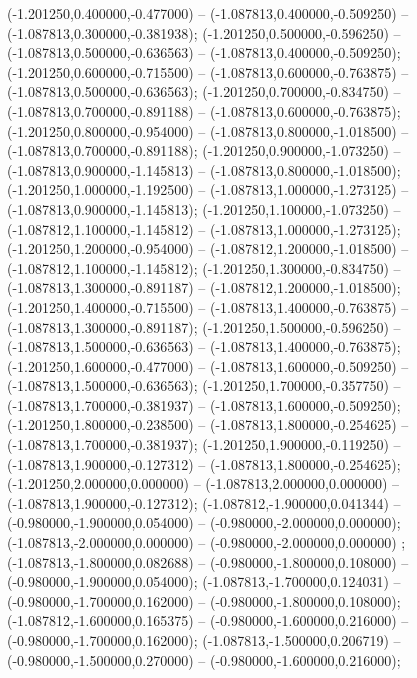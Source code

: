  (-1.201250,0.400000,-0.477000) -- (-1.087813,0.400000,-0.509250) -- (-1.087813,0.300000,-0.381938);
 (-1.201250,0.500000,-0.596250) -- (-1.087813,0.500000,-0.636563) -- (-1.087813,0.400000,-0.509250);
 (-1.201250,0.600000,-0.715500) -- (-1.087813,0.600000,-0.763875) -- (-1.087813,0.500000,-0.636563);
 (-1.201250,0.700000,-0.834750) -- (-1.087813,0.700000,-0.891188) -- (-1.087813,0.600000,-0.763875);
 (-1.201250,0.800000,-0.954000) -- (-1.087813,0.800000,-1.018500) -- (-1.087813,0.700000,-0.891188);
 (-1.201250,0.900000,-1.073250) -- (-1.087813,0.900000,-1.145813) -- (-1.087813,0.800000,-1.018500);
 (-1.201250,1.000000,-1.192500) -- (-1.087813,1.000000,-1.273125) -- (-1.087813,0.900000,-1.145813);
 (-1.201250,1.100000,-1.073250) -- (-1.087812,1.100000,-1.145812) -- (-1.087813,1.000000,-1.273125);
 (-1.201250,1.200000,-0.954000) -- (-1.087812,1.200000,-1.018500) -- (-1.087812,1.100000,-1.145812);
 (-1.201250,1.300000,-0.834750) -- (-1.087813,1.300000,-0.891187) -- (-1.087812,1.200000,-1.018500);
 (-1.201250,1.400000,-0.715500) -- (-1.087813,1.400000,-0.763875) -- (-1.087813,1.300000,-0.891187);
 (-1.201250,1.500000,-0.596250) -- (-1.087813,1.500000,-0.636563) -- (-1.087813,1.400000,-0.763875);
 (-1.201250,1.600000,-0.477000) -- (-1.087813,1.600000,-0.509250) -- (-1.087813,1.500000,-0.636563);
 (-1.201250,1.700000,-0.357750) -- (-1.087813,1.700000,-0.381937) -- (-1.087813,1.600000,-0.509250);
 (-1.201250,1.800000,-0.238500) -- (-1.087813,1.800000,-0.254625) -- (-1.087813,1.700000,-0.381937);
 (-1.201250,1.900000,-0.119250) -- (-1.087813,1.900000,-0.127312) -- (-1.087813,1.800000,-0.254625);
 (-1.201250,2.000000,0.000000) -- (-1.087813,2.000000,0.000000) -- (-1.087813,1.900000,-0.127312);
 (-1.087812,-1.900000,0.041344) -- (-0.980000,-1.900000,0.054000) -- (-0.980000,-2.000000,0.000000);
 (-1.087813,-2.000000,0.000000) -- (-0.980000,-2.000000,0.000000) ;
 (-1.087813,-1.800000,0.082688) -- (-0.980000,-1.800000,0.108000) -- (-0.980000,-1.900000,0.054000);
 (-1.087813,-1.700000,0.124031) -- (-0.980000,-1.700000,0.162000) -- (-0.980000,-1.800000,0.108000);
 (-1.087812,-1.600000,0.165375) -- (-0.980000,-1.600000,0.216000) -- (-0.980000,-1.700000,0.162000);
 (-1.087813,-1.500000,0.206719) -- (-0.980000,-1.500000,0.270000) -- (-0.980000,-1.600000,0.216000);
